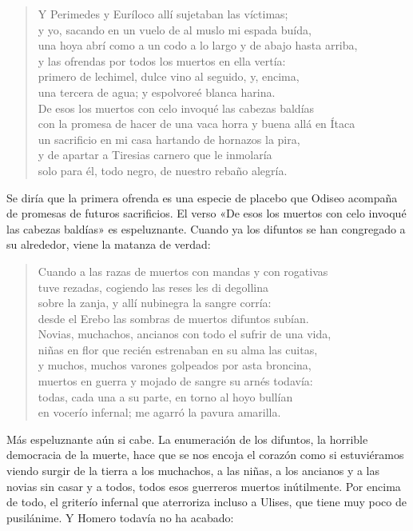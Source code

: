 \documentclass[11pt,a4paper]{article}
\begin{document}
\begin{verse}
Y Perimedes y Euríloco allí sujetaban las víctimas;\\
y yo, sacando en un vuelo de al muslo mi espada buída,\\
una hoya abrí como a un codo a lo largo y de abajo hasta arriba,\\
y las ofrendas por todos los muertos en ella vertía:\\
primero de lechimel, dulce vino al seguido, y, encima,\\
una tercera de agua; y espolvoreé blanca harina.\\
De esos los muertos con celo invoqué las cabezas baldías\\
con la promesa de hacer de una vaca horra y buena allá en Ítaca\\
un sacrificio en mi casa hartando de hornazos la pira,\\
y de apartar a Tiresias carnero que le inmolaría\\
solo para él, todo negro, de nuestro rebaño alegría.
\end{verse}

Se diría que la primera ofrenda es una especie de placebo que Odiseo acompaña de promesas de futuros sacrificios. El verso «De esos los muertos con celo invoqué las cabezas baldías» es espeluznante. Cuando ya los difuntos se han congregado a su alrededor, viene la matanza de verdad:

\begin{verse}
Cuando a las razas de muertos con mandas y con rogativas\\
tuve rezadas, cogiendo las reses les di degollina\\
sobre la zanja, y allí nubinegra la sangre corría:\\
desde el Erebo las sombras de muertos difuntos subían.\\
Novias, muchachos, ancianos con todo el sufrir de una vida,\\
niñas en flor que recién estrenaban en su alma las cuitas,\\
y muchos, muchos varones golpeados por asta broncina,\\
muertos en guerra y mojado de sangre su arnés todavía:\\
todas, cada una a su parte, en torno al hoyo bullían\\
en vocerío infernal; me agarró la pavura amarilla.
\end{verse}

Más espeluznante aún si cabe. La enumeración de los difuntos, la horrible democracia de la muerte, hace que se nos encoja el corazón como si estuviéramos viendo surgir de la tierra a los muchachos, a las niñas, a los ancianos y a las novias sin casar y a todos, todos esos guerreros muertos inútilmente. Por encima de todo, el griterío infernal que aterroriza incluso a Ulises, que tiene muy poco de pusilánime. Y Homero todavía no ha acabado:
\end{document}
